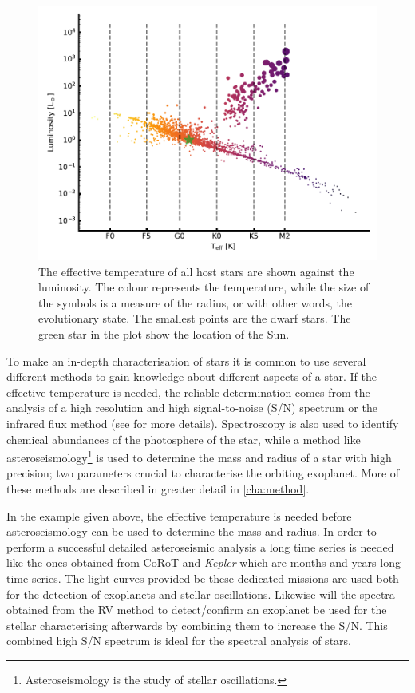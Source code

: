 \begin{figure}[htpb!]
    \centering
    \includegraphics[width=1.0\linewidth]{figures/hostDistribution.pdf}
    \caption{The effective temperature of all host stars are shown against the luminosity. The
             colour represents the temperature, while the size of the symbols is a measure of the
             radius, or with other words, the evolutionary state. The smallest points are the dwarf
             stars. The green star in the plot show the location of the Sun.}
    \label{fig:hostDistribution}
\end{figure}

To make an in-depth characterisation of stars it is common to use several different methods to gain
knowledge about different aspects of a star. If the effective temperature is needed, the reliable
determination comes from the analysis of a high resolution and high signal-to-noise (S/N) spectrum
or the infrared flux method (see  for more details). Spectroscopy is also used to
identify chemical abundances of the photosphere of the star, while a method like
asteroseismology\footnote{Asteroseismology is the study of stellar oscillations.} is used to
determine the mass and radius of a star with high precision; two parameters crucial to characterise
the orbiting exoplanet. More of these methods are described in greater detail in \cref{cha:method}.

In the example given above, the effective temperature is needed before asteroseismology can be used
to determine the mass and radius. In order to perform a successful detailed asteroseismic analysis
a long time series is needed like the ones obtained from CoRoT and \emph{Kepler} which are months
and years long time series. The light curves provided be these dedicated missions are used both for
the detection of exoplanets and stellar oscillations. Likewise will the spectra obtained from the RV
method to detect/confirm an exoplanet be used for the stellar characterising afterwards by combining
them to increase the S/N. This combined high S/N spectrum is ideal for the spectral analysis of
stars.

